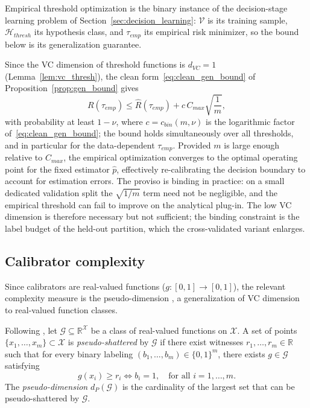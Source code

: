 Empirical threshold optimization is the binary instance of the decision-stage learning problem of Section~\ref{sec:decision_learning}: $\mathcal{V}$ is its training sample, $\mathcal{H}_{thresh}$ its hypothesis class, and $\tau_{emp}$ its empirical risk minimizer, so the bound below is its generalization guarantee.

Since the VC dimension of threshold functions is $d_{VC}=1$ (Lemma~\ref{lem:vc_thresh}), the clean form~\eqref{eq:clean_gen_bound} of Proposition~\ref{prop:gen_bound} gives
\begin{equation}
    R(\tau_{emp}) \leq \hat{R}(\tau_{emp}) + c\, C_{max} \sqrt{\frac{1}{m}},
\end{equation}
with probability at least $1-\nu$, where $c = c_{bin}(m,\nu)$ is the logarithmic factor of~\eqref{eq:clean_gen_bound}; the bound holds simultaneously over all thresholds, and in particular for the data-dependent $\tau_{emp}$. Provided $m$ is large enough relative to $C_{max}$, the empirical optimization converges to the optimal operating point for the fixed estimator $\hat{p}$, effectively re-calibrating the decision boundary to account for estimation errors. The proviso is binding in practice: on a small dedicated validation split the $\sqrt{1/m}$ term need not be negligible, and the empirical threshold can fail to improve on the analytical plug-in. The low VC dimension is therefore necessary but not sufficient; the binding constraint is the label budget of the held-out partition, which the cross-validated variant enlarges.

\subsection{Calibrator complexity}

Since calibrators are real-valued functions ($g: [0,1] \to [0,1]$), the relevant complexity measure is the pseudo-dimension \citep{pollard1984convergence,haussler1992decision}, a generalization of VC dimension to real-valued function classes.

\begin{definition}\label{def:pseudo_dimension}
    Following \citet[Definitions~11.1 and~11.2]{anthony1999neural}, let $\mathcal{G} \subseteq \mathbb{R}^{\mathcal{X}}$ be a class of real-valued functions on $\mathcal{X}$. A set of points $\{x_1, \ldots, x_m\} \subset \mathcal{X}$ is \emph{pseudo-shattered} by $\mathcal{G}$ if there exist witnesses $r_1, \ldots, r_m \in \mathbb{R}$ such that for every binary labeling $(b_1, \ldots, b_m) \in \{0,1\}^m$, there exists $g \in \mathcal{G}$ satisfying
    \begin{equation}
        g(x_i) \geq r_i \iff b_i = 1, \quad \text{for all } i = 1, \ldots, m.
    \end{equation}
    The \emph{pseudo-dimension} $d_P(\mathcal{G})$ is the cardinality of the largest set that can be pseudo-shattered by $\mathcal{G}$.
\end{definition}

